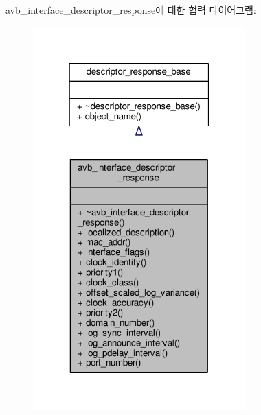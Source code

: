 avb\+\_\+interface\+\_\+descriptor\+\_\+response에 대한 협력 다이어그램\+:
\nopagebreak
\begin{figure}[H]
\begin{center}
\leavevmode
\includegraphics[width=232pt]{classavdecc__lib_1_1avb__interface__descriptor__response__coll__graph}
\end{center}
\end{figure}
